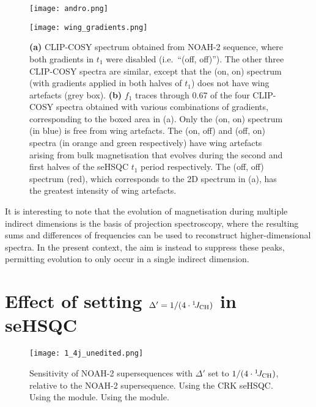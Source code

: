 \begin{figure}
    \centering
    \texttt{[image: andro.png]}

    \texttt{[image: wing\_gradients.png]}
    \caption{
        \textbf{(a)} CLIP-COSY spectrum obtained from NOAH-2  sequence, where both gradients in $t_1$ were disabled (i.e.\ ``(off, off)'').
        The other three CLIP-COSY spectra are similar, except that the (on, on) spectrum (with gradients applied in both halves of $t_1$) does not have wing artefacts (grey box).
        \textbf{(b)} $f_1$ traces through \SI{0.67}{\ppm} of the four CLIP-COSY spectra obtained with various combinations of gradients, corresponding to the boxed area in (a).
        Only the (on, on) spectrum (in blue) is free from wing artefacts.
        The (on, off) and (off, on) spectra (in orange and green respectively) have wing artefacts arising from bulk magnetisation that evolves during the second and first halves of the seHSQC $t_1$ period respectively.
        The (off, off) spectrum (red), which corresponds to the 2D spectrum in (a), has the greatest intensity of wing artefacts.
        \andro{}
    }
    \label{fig:wing_gradients}
\end{figure}

It is interesting to note that the evolution of magnetisation during multiple indirect dimensions is the basis of projection spectroscopy,\autocite{projrecon} where the resulting sums and differences of frequencies can be used to reconstruct higher-dimensional spectra.
In the present context, the aim is instead to suppress these peaks, permitting evolution to only occur in a single indirect dimension.


\section{Effect of setting \texorpdfstring{$\Delta' = 1/(4\cdot\onejch)$}{Delta' = 1/(4*1JCH)} in seHSQC}

\begin{figure}
    \centering
    \texttt{[image: 1\_4j\_unedited.png]}
    {\label{fig:1_4j_unedited_crk}}
    {\label{fig:1_4j_unedited_spv1}}
    {\label{fig:1_4j_unedited_spv2}}
    \caption{
        Sensitivity of NOAH-2  supersequences with $\Delta'$ set to $1/(4\cdot\onejch)$, relative to the NOAH-2  supersequence.
        \textbf{} Using the CRK seHSQC.
        \textbf{} Using the \noahSpa{} module.
        \textbf{} Using the \noahSpb{} module.
        \andro{}
    }
    \label{fig:1_4j_unedited}
\end{figure}

